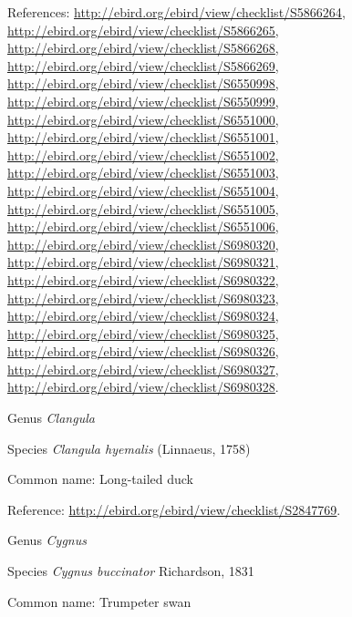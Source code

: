 \documentclass[9pt, article]{memoir}
\begin{document}
\begin{multicols}{2}
References: 
\url{http://ebird.org/ebird/view/checklist/S5866264}, 
\url{http://ebird.org/ebird/view/checklist/S5866265}, 
\url{http://ebird.org/ebird/view/checklist/S5866268}, 
\url{http://ebird.org/ebird/view/checklist/S5866269}, 
\url{http://ebird.org/ebird/view/checklist/S6550998}, 
\url{http://ebird.org/ebird/view/checklist/S6550999}, 
\url{http://ebird.org/ebird/view/checklist/S6551000}, 
\url{http://ebird.org/ebird/view/checklist/S6551001}, 
\url{http://ebird.org/ebird/view/checklist/S6551002}, 
\url{http://ebird.org/ebird/view/checklist/S6551003}, 
\url{http://ebird.org/ebird/view/checklist/S6551004}, 
\url{http://ebird.org/ebird/view/checklist/S6551005}, 
\url{http://ebird.org/ebird/view/checklist/S6551006}, 
\url{http://ebird.org/ebird/view/checklist/S6980320}, 
\url{http://ebird.org/ebird/view/checklist/S6980321}, 
\url{http://ebird.org/ebird/view/checklist/S6980322}, 
\url{http://ebird.org/ebird/view/checklist/S6980323}, 
\url{http://ebird.org/ebird/view/checklist/S6980324}, 
\url{http://ebird.org/ebird/view/checklist/S6980325}, 
\url{http://ebird.org/ebird/view/checklist/S6980326}, 
\url{http://ebird.org/ebird/view/checklist/S6980327}, 
\url{http://ebird.org/ebird/view/checklist/S6980328}.

\vspace{6pt}\noindent\hspace{30pt}Genus \textit{Clangula}


\vspace{6pt}\noindent\hspace{36pt}Species \textit{Clangula hyemalis} (Linnaeus, 1758)


Common name: Long-tailed duck

Reference: 
\url{http://ebird.org/ebird/view/checklist/S2847769}.

\vspace{6pt}\noindent\hspace{30pt}Genus \textit{Cygnus}


\vspace{6pt}\noindent\hspace{36pt}Species \textit{Cygnus buccinator} Richardson, 1831


Common name: Trumpeter swan


\end{multicols}
\end{document}
